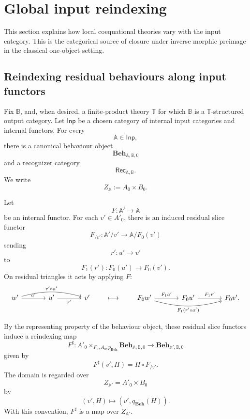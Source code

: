 \section{Global input reindexing}
\label{sec:global-input-reindexing}

This section explains how local coequational theories vary with the input
category. This is the categorical source of closure under inverse morphic
preimage in the classical one-object setting.

\subsection{Reindexing residual behaviours along input functors}
\label{subsec:input-reindexing-behaviours}

Fix \(\mathbb B\), and, when desired, a finite-product theory \(\mathbb T\) for
which \(\mathbb B\) is a \(\mathbb T\)-structured output category. Let
\(\mathsf{Inp}\) be a chosen category of internal input categories and internal
functors. For every
\[
    \mathbb A\in\mathsf{Inp},
\]
there is a canonical behaviour object
\[
    \mathbf{Beh}_{\mathbb A,\mathbb B,0}
\]
and a recognizer category
\[
    \mathsf{Rec}_{\mathbb A,\mathbb B}.
\]
We write
\[
    Z_{\mathbb A}:=A_0\times B_0.
\]

Let
\[
    F:\mathbb A'\to\mathbb A
\]
be an internal functor. For each \(v'\in A'_0\), there is an induced residual
slice functor
\[
    F_{/v'}:
    \mathbb A'/v'\to \mathbb A/F_0(v')
\]
sending
\[
    r':u'\to v'
\]
to
\[
    F_1(r'):F_0(u')\to F_0(v').
\]
On residual triangles it acts by applying \(F\):
\[
\begin{tikzcd}[column sep=large, row sep=large]
    w'
        \arrow[r, "a'"]
        \arrow[rr, "r'\circ a'", bend left=15]
    &
    u'
        \arrow[r, "r'"']
    &
    v'
\end{tikzcd}
\qquad\longmapsto\qquad
\begin{tikzcd}[column sep=large, row sep=large]
    F_0w'
        \arrow[r, "F_1a'"]
        \arrow[rr, "F_1(r'\circ a')"', bend right=15]
    &
    F_0u'
        \arrow[r, "F_1r'"]
    &
    F_0v'.
\end{tikzcd}
\]

By the representing property of the behaviour object, these residual slice
functors induce a reindexing map
\[
    F^\sharp:
    A'_0\times_{F_0,A_0,p_{\mathbf{Beh}}}
    \mathbf{Beh}_{\mathbb A,\mathbb B,0}
    \to
    \mathbf{Beh}_{\mathbb A',\mathbb B,0}
\]
given by
\[
    F^\sharp(v',H)=H\circ F_{/v'}.
\]
The domain is regarded over
\[
    Z_{\mathbb A'}=A'_0\times B_0
\]
by
\[
    (v',H)\longmapsto (v',q_{\mathbf{Beh}}(H)).
\]
With this convention, \(F^\sharp\) is a map over \(Z_{\mathbb A'}\).

